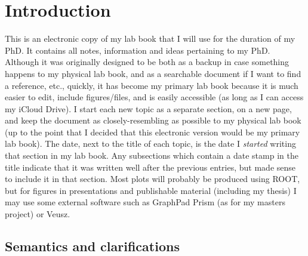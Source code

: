 \section{Introduction}
\label{sec:introduction}

This is an electronic copy of my lab book that I will use for the duration of my PhD. It contains all notes, information and ideas pertaining to my PhD. Although it was originally designed to be both as a backup in case something happens to my physical lab book, and as a searchable document if I want to find a reference, etc., quickly, it has become my primary lab book because it is much easier to edit, include figures/files, and is easily accessible (as long as I can access my iCloud Drive). I start each new topic as a separate section, on a new page, and keep the document as closely-resembling as possible to my physical lab book (up to the point that I decided that this electronic version would be my primary lab book). The date, next to the title of each topic, is the date I \emph{started} writing that section in my lab book. Any subsections which contain a date stamp in the title indicate that it was written well after the previous entries, but made sense to include it in that section. Most plots will probably be produced using ROOT, but for figures in presentations and publishable material (including my thesis) I may use some external software such as GraphPad Prism (as for my masters project) or Veusz.

\subsection{Semantics and clarifications}

